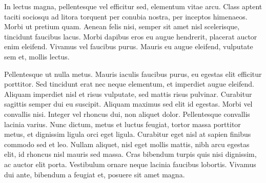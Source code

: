 \documentclass[]{article}
\begin{document}
In lectus magna, pellentesque vel efficitur sed, elementum vitae arcu. Class aptent taciti sociosqu ad litora torquent per conubia nostra, per inceptos himenaeos. Morbi ut pretium quam. Aenean felis nisi, semper sit amet nisl scelerisque, tincidunt faucibus lacus. Morbi dapibus eros eu augue hendrerit, placerat auctor enim eleifend. Vivamus vel faucibus purus. Mauris eu augue eleifend, vulputate sem et, mollis lectus.

Pellentesque ut nulla metus. Mauris iaculis faucibus purus, eu egestas elit efficitur porttitor. Sed tincidunt erat nec neque elementum, et imperdiet augue eleifend. Aliquam imperdiet nisl et risus vulputate, sed mattis risus pulvinar. Curabitur sagittis semper dui eu suscipit. Aliquam maximus sed elit id egestas. Morbi vel convallis nisi. Integer vel rhoncus dui, non aliquet dolor. Pellentesque convallis lacinia varius. Nunc dictum, metus et luctus feugiat, tortor massa porttitor metus, et dignissim ligula orci eget ligula. Curabitur eget nisl at sapien finibus commodo sed et leo. Nullam aliquet, nisl eget mollis mattis, nibh arcu egestas elit, id rhoncus nisl mauris sed massa. Cras bibendum turpis quis nisi dignissim, ac auctor elit porta. Vestibulum ornare neque lacinia faucibus lobortis. Vivamus dui ante, bibendum a feugiat et, posuere sit amet magna.
\newpage
\end{document}

